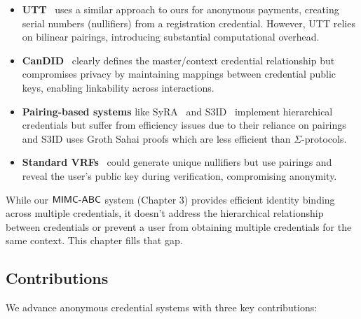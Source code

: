 \begin{itemize}
    \item \textbf{UTT}~\cite{tomescu2022utt} uses a similar approach to ours for anonymous payments, creating serial numbers (nullifiers) from a registration credential. However, UTT relies on bilinear pairings, introducing substantial computational overhead.
    
    \item \textbf{CanDID}~\cite{maram2021candid} clearly defines the master/context credential relationship but compromises privacy by maintaining mappings between credential public keys, enabling linkability across interactions.
    
    \item \textbf{Pairing-based systems} like SyRA~\cite{crites_syra_2024} and S3ID~\cite{rabaninejad_attribute-based_2024} implement hierarchical credentials but suffer from efficiency issues due to their reliance on pairings and S3ID uses Groth Sahai proofs which are less efficient than $\Sigma$-protocols.
    
    \item \textbf{Standard VRFs}~\cite{hutchison_verifiable_2005} could generate unique nullifiers but use pairings and reveal the user's public key during verification, compromising anonymity.
\end{itemize}

While our $\mathsf{MIMC\text{-}ABC}$ system (Chapter 3) provides efficient identity binding across multiple credentials, it doesn't address the hierarchical relationship between credentials or prevent a user from obtaining multiple credentials for the same context. This chapter fills that gap.

\subsection{Contributions}

We advance anonymous credential systems with three key contributions:

